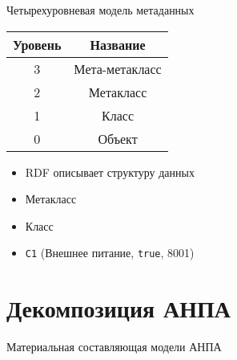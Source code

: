 \begin{frame}{Четырехуровневая модель метаданных}
    \begin{minipage}[t]{0.4\linewidth}
    \centering
    \begin{tabular}{cc}
    \toprule
    \textbf{Уровень} & \textbf{Название} \\ \midrule
        3 & Мета-метакласс \\\hline
        2 & Метакласс      \\\hline
        1 & Класс          \\\hline
        0 & Объект         \\\hline
    \bottomrule
    \end{tabular}
\end{minipage}
\hfill\vrule
\begin{minipage}[t]{0.55\linewidth}
    \centering
    \begin{itemize}
        \item RDF описывает структуру данных
        \item Метакласс
        \item Класс
        \item \texttt{C1} (Внешнее питание, \texttt{true}, 8001)
    \end{itemize}
\end{minipage}
\end{frame}

\section[Анализ]{Декомпозиция АНПА}
\begin{frame}{Материальная составляющая модели АНПА}
\end{frame}
\note{
}


